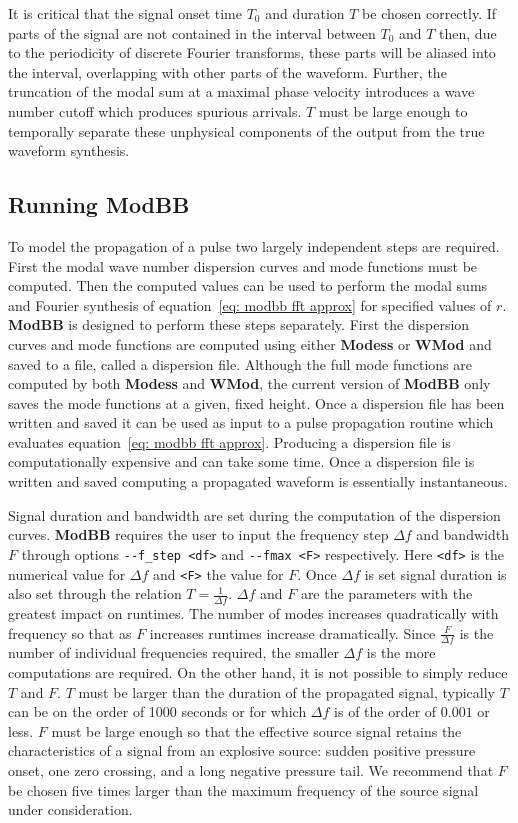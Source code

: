 It is critical that the signal onset time $T_0$ and duration $T$ be chosen correctly. If parts of the signal are not contained in the interval between $T_0$ and $T$ then, due to the periodicity of discrete Fourier transforms, these parts will be aliased into the interval, overlapping with other parts of the waveform. Further, the truncation of the modal sum at a maximal phase velocity introduces a wave number cutoff which produces spurious arrivals. $T$ must be large enough to temporally separate these unphysical components of the output from the true waveform synthesis. 

\subsection{Running ModBB}
\label{sec:running modbb}

To model the propagation of a pulse two largely independent steps are required. First the modal wave number dispersion curves and mode functions must be computed. Then the computed values can be used to perform the modal sums and Fourier synthesis of equation~\ref{eq: modbb fft approx} for specified values of $r$. {\bf ModBB} is designed to perform these steps separately. First the dispersion curves and mode functions are computed using either {\bf Modess} or {\bf WMod} and saved to a file, called a dispersion file. Although the full mode functions are computed by both {\bf Modess} and {\bf WMod}, the current version of {\bf ModBB} only saves the mode functions at a given, fixed height. Once a dispersion file has been written and saved it can be used as input to a pulse propagation routine which evaluates equation~\ref{eq: modbb fft approx}. Producing a dispersion file is computationally expensive and can take some time. Once a dispersion file is written and saved computing a propagated waveform is essentially instantaneous. 

Signal duration and bandwidth are set during the computation of the dispersion curves. {\bf ModBB} requires the user to input the frequency step $\Delta f$ and bandwidth $F$ through options \verb+--f_step <df>+ and \verb+--fmax <F>+ respectively. Here \verb+<df>+ is the numerical value for $\Delta f$ and \verb+<F>+ the value for $F$. Once $\Delta f$ is set signal duration is also set through the relation $T=\frac{1}{\Delta f}$. $\Delta f$ and $F$ are the parameters with the greatest impact on runtimes. The number of modes increases quadratically with frequency so that as $F$ increases runtimes increase dramatically. Since $\frac{F}{\Delta f}$ is the number of individual frequencies required, the smaller $\Delta f$ is the more computations are required. On the other hand, it is not possible to simply reduce $T$ and $F$. $T$ must be larger than the duration of the propagated signal, typically $T$ can be on the order of 1000 seconds or for which $\Delta f$ is of the order of $0.001$ or less. $F$ must be large enough so that the effective source signal retains the characteristics of a signal from an explosive source: sudden positive pressure onset, one zero crossing, and a long negative pressure tail. We recommend that $F$ be chosen five times larger than the maximum frequency of the source signal under consideration. 

